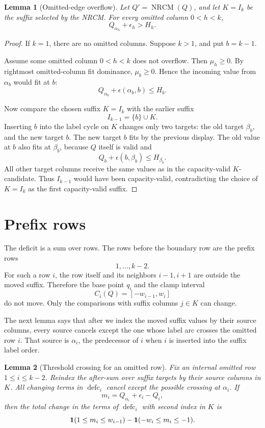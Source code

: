 \documentclass[10pt]{article}
\newtheorem{lemma}{Lemma}
\newcommand{\defc}{\operatorname{defc}}
\newcommand{\NRCM}{\operatorname{NRCM}}
\begin{document}
\begin{lemma}[Omitted-edge overflow]
Let \(Q'=\NRCM(Q)\), and let \(K=I_k\) be the suffix selected by the NRCM.
For every omitted column \(0<h<k\),
\[
  Q_{\alpha_h}+\epsilon_h>H_h.
\]
\end{lemma}

\begin{proof}
If \(k=1\), there are no omitted columns.  Suppose \(k>1\), and put
\(b=k-1\).

Assume some omitted column \(0<h<k\) does not overflow.  Then \(\mu_h\ge0\).
By rightmost omitted-column fit dominance, \(\mu_b\ge0\).  Hence the incoming
value from \(\alpha_b\) would fit at \(b\):
\[
  Q_{\alpha_b}+\epsilon(\alpha_b,b)\le H_b.
\]

Now compare the chosen suffix \(K=I_k\) with the earlier suffix
\[
  I_{k-1}=\{b\}\cup K.
\]
Inserting \(b\) into the label cycle on \(K\) changes only two targets: the
old target \(\beta_b\), and the new target \(b\).  The new target \(b\) fits
by the previous display.  The old value at \(b\) also fits at \(\beta_b\),
because \(Q\) itself is valid and
\[
  Q_b+\epsilon(b,\beta_b)\le H_{\beta_b}.
\]
All other target columns receive the same values as in the capacity-valid
\(K\)-candidate.  Thus \(I_{k-1}\) would have been capacity-valid, contradicting
the choice of \(K=I_k\) as the first capacity-valid suffix.
\end{proof}

\section{Prefix rows}

The deficit is a sum over rows.  The rows before the boundary row are the
prefix rows
\[
  1,\ldots,k-2.
\]
For such a row \(i\), the row itself and its neighbors \(i-1,i+1\) are outside
the moved suffix.  Therefore the base point \(q_i\) and the clamp interval
\[
  C_i(Q)=[-w_{i-1},w_i]
\]
do not move.  Only the comparisons with suffix columns \(j\in K\) can change.

The next lemma says that after we index the moved suffix values by their source
columns, every source cancels except the one whose label arc crosses the
omitted row \(i\).  That source is \(\alpha_i\), the predecessor of \(i\) when
\(i\) is inserted into the suffix label order.

\begin{lemma}[Threshold crossing for an omitted row]
Fix an internal omitted row \(1\le i\le k-2\).  Reindex the after-sum over
suffix targets by their source columns in \(K\).  All changing terms in
\(\defc_i\) cancel except the possible crossing at \(\alpha_i\).  If
\[
  m_i=Q_{\alpha_i}+\epsilon_i-Q_i,
\]
then the total change in the terms of \(\defc_i\) with second index in \(K\)
is
\[
  {\bf 1}(1\le m_i\le w_{i-1})
  -
  {\bf 1}(-w_i\le m_i\le -1).
\]
\end{lemma}
\end{document}
